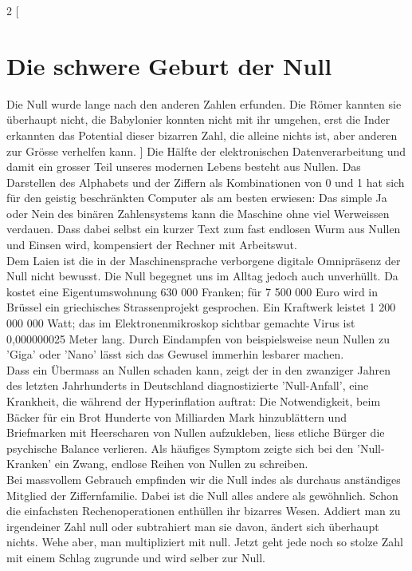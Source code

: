 \documentclass[%
11pt,%
twoside,%
titlepage,%
german,%
headsepline%
]{scrartcl}
\begin{document}
\begin{multicols}{2}
[
\section{Die schwere Geburt der Null}\label{ap:null}
Die Null wurde lange nach den anderen Zahlen erfunden. Die R\"omer kannten sie überhaupt nicht, die Babylonier konnten nicht mit ihr umgehen, erst die Inder erkannten das Potential dieser bizarren Zahl, die alleine nichts ist, aber anderen zur Gr\"osse verhelfen kann.
]
Die Hälfte der elektronischen Datenverarbeitung und damit ein grosser Teil unseres modernen Lebens besteht aus Nullen. Das Darstellen des Alphabets und der Ziffern als Kombinationen von 0 und 1 hat sich für den geistig beschränkten Computer als am besten erwiesen: Das simple Ja oder Nein des binären Zahlensystems kann die Maschine ohne viel Werweissen verdauen. Dass dabei selbst ein kurzer Text zum fast endlosen Wurm aus Nullen und Einsen wird, kompensiert der Rechner mit Arbeitswut.
\\
Dem Laien ist die in der Maschinensprache verborgene digitale Omnipräsenz der Null nicht bewusst. Die Null begegnet uns im Alltag jedoch auch unverhüllt. Da kostet eine Eigentumswohnung 630 000 Franken; für 7 500 000 Euro wird in Brüssel ein griechisches Strassenprojekt gesprochen. Ein Kraftwerk leistet 1 200 000 000 Watt; das im Elektronenmikroskop sichtbar gemachte Virus ist 0,000000025 Meter lang. Durch Eindampfen von beispielsweise neun Nullen zu 'Giga' oder 'Nano' lässt sich das Gewusel immerhin lesbarer machen.
\\
Dass ein Übermass an Nullen schaden kann, zeigt der in den zwanziger Jahren des letzten Jahrhunderts in Deutschland diagnostizierte 'Null-Anfall', eine Krankheit, die während der Hyperinflation auftrat: Die Notwendigkeit, beim Bäcker für ein Brot Hunderte von Milliarden Mark hinzublättern und Briefmarken mit Heerscharen von Nullen aufzukleben, liess etliche Bürger die psychische Balance verlieren. Als häufiges Symptom zeigte sich bei den 'Null-Kranken' ein Zwang, endlose Reihen von Nullen zu schreiben.
\\
Bei massvollem Gebrauch empfinden wir die Null indes als durchaus anständiges Mitglied der Ziffernfamilie. Dabei ist die Null alles andere als gewöhnlich. Schon die einfachsten Rechenoperationen enthüllen ihr bizarres Wesen. Addiert man zu irgendeiner Zahl null oder subtrahiert man sie davon, ändert sich überhaupt nichts. Wehe aber, man multipliziert mit null. Jetzt geht jede noch so stolze Zahl mit einem Schlag zugrunde und wird selber zur Null.

\end{multicols}
\end{document}
